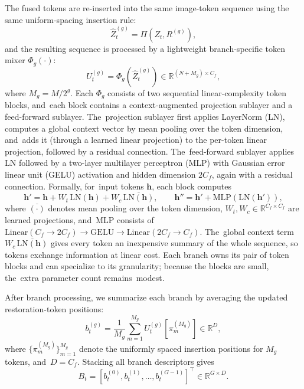 \documentclass[symmetry,article,accept,pdftex,moreauthors]{Definitions/mdpi}
\begin{document}
The fused tokens are re-inserted into the same image-token sequence using the same uniform-spacing insertion rule:
\begin{equation}
\widehat{Z}_t^{(g)} = \Pi\!\left(Z_t,R^{(g)}\right),
\end{equation}
and the resulting sequence is processed by a lightweight branch-specific token mixer $\Phi_g(\cdot)$:
\begin{equation}
U_t^{(g)} = \Phi_g\!\left(\widehat{Z}_t^{(g)}\right)
\in \mathbb{R}^{(N+M_g)\times C_f},
\end{equation}
where $M_g = M/2^g$. Each $\Phi_g$ consists of two sequential linear-complexity token blocks, and~each block contains a context-augmented projection sublayer and a feed-forward sublayer. The~projection sublayer first applies LayerNorm (LN), computes a global context vector by mean pooling over the token dimension, and~adds it (through a learned linear projection) to the per-token linear projection, followed by a residual connection. The~feed-forward sublayer applies LN followed by a two-layer multilayer perceptron (MLP) with Gaussian error linear unit (GELU) activation and hidden dimension $2C_f$, again with a residual connection. Formally, for~input tokens $\mathbf{h}$, each block computes
\begin{equation}
\mathbf{h}' = \mathbf{h} + W_t\,\mathrm{LN}(\mathbf{h}) + W_c\,\overline{\mathrm{LN}(\mathbf{h})},\qquad
\mathbf{h}'' = \mathbf{h}' + \mathrm{MLP}(\mathrm{LN}(\mathbf{h}')),
\end{equation}
where $\overline{(\cdot)}$ denotes mean pooling over the token dimension, $W_t,W_c\in\mathbb{R}^{C_f\times C_f}$ are learned projections, and~MLP consists of $\mathrm{Linear}(C_f\!\rightarrow\!2C_f)\!\rightarrow\!\mathrm{GELU}\!\rightarrow\!\mathrm{Linear}(2C_f\!\rightarrow\!C_f)$. The~global context term $W_c\,\overline{\mathrm{LN}(\mathbf{h})}$ gives every token an inexpensive summary of the whole sequence, so tokens exchange information at linear cost. Each branch owns its pair of token blocks and can specialize to its granularity; because the blocks are small, the~extra parameter count remains~modest.

After branch processing, we summarize each branch by averaging the updated restoration-token positions:
\begin{equation}
b_t^{(g)} =
\frac{1}{M_g}
\sum_{m=1}^{M_g}
U_t^{(g)}[\pi_m^{(M_g)}]
\in \mathbb{R}^{D},
\end{equation}
where $\{\pi_m^{(M_g)}\}_{m=1}^{M_g}$ denote the uniformly spaced insertion positions for $M_g$ tokens, and~\linebreak  $D=C_f$. Stacking all branch descriptors gives
\begin{equation}
B_t =
\left[
b_t^{(0)}, b_t^{(1)}, \ldots, b_t^{(G-1)}
\right]^\top
\in \mathbb{R}^{G \times D}.
\end{equation}
\end{document}
